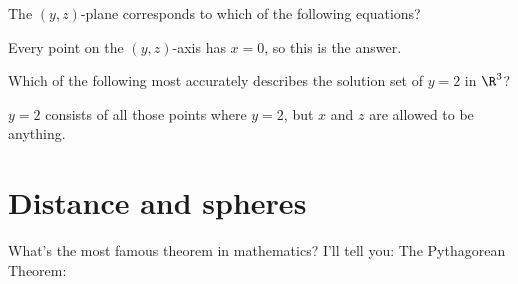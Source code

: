 \documentclass{ximera}
\begin{document}
\begin{question}
  The $(y,z)$-plane corresponds to which of the following
  equations?
  \begin{multipleChoice}
  \end{multipleChoice}
  \begin{hint}
    Every point on the $(y,z)$-axis has $x=0$, so this is the answer.
  \end{hint}
\end{question}

\begin{question}
  Which of the following most accurately describes the solution
  set of $y=2$ in $\R^3$?
  \begin{multipleChoice}
  \end{multipleChoice}
  \begin{hint}
    $y=2$ consists of all those points where $y=2$, but $x$ and
    $z$ are allowed to be anything.  
  \end{hint}
\end{question}


\section{Distance and spheres}

What's the most famous theorem in mathematics? I'll tell you: The
Pythagorean Theorem:
\end{document}
